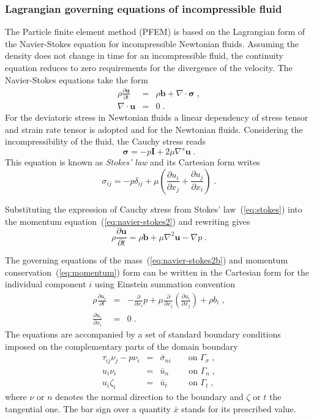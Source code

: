 \documentclass[a4paper]{report}
\newcommand{\mbf}[1]{\boldsymbol{#1}}
\newcommand{\pard}[2]{\frac{\partial{#1}}{\partial{#2}}}
\begin{document}
\subsubsection{Lagrangian governing equations of incompressible fluid}
The Particle finite element method (PFEM) is based on the Lagrangian form of the Navier-Stokes equation for incompressible Newtonian fluids. Assuming the density does not change in time for an incompressible fluid, the continuity equation reduces to zero requirements for the divergence of the velocity. The Navier-Stokes equations take the form
\begin{eqnarray}
\rho\pard{\mbf{u}}{t} &=& \rho\mbf{b} + \nabla\cdot\mbf{\sigma} \label{eq:navier-stokes2}\;,\\
\nabla\cdot\mbf{u} &=& 0\;. \label{eq:navier-stokes2b}
\end{eqnarray}
For the deviatoric stress in Newtonian fluids a linear dependency of stress tensor and strain rate tensor is adopted and for the Newtonian fluids. Considering the incompressibility of the fluid, the Cauchy stress reads
\begin{equation}\label{eq:stokes}
\mbf{\sigma}=-p\mbf{I} + 2\mu \nabla^s\mbf{u}\;.
\end{equation}
This equation is known as \emph{Stokes' law} and its Cartesian form writes
\begin{equation}
\sigma_{ij}=-p\delta_{ij}+\mu\left(\pard{u_i}{x_j}+\pard{u_j}{x_i}\right)\;.
\end{equation}
\par
Substituting the expression of Cauchy stress from Stokes' law~(\ref{eq:stokes}) into the momentum equation~(\ref{eq:navier-stokes2}) and rewriting gives
\begin{equation}
\rho\pard{\mbf{u}}{t} = \rho\mbf{b} + \mu\nabla^2\mbf{u} - \nabla p\;.\label{eq:momentum}
\end{equation}
\par
The governing equations of the mass~(\ref{eq:navier-stokes2b}) and momentum conservation~(\ref{eq:momentum}) form can be written in the Cartesian form for the individual component $i$ using Einstein summation convention
\begin{eqnarray}
\rho \pard{u_i}{t} &=& - \frac{\partial}{\partial x_i}p+\mu\frac{\partial}{\partial x_j}\left(\frac{\partial u_i}{\partial x_j}\right)+\rho b_i \;, \label{eq:mb}\\
\pard{u_i}{x_i} &=& 0\;.
\end{eqnarray}
The equations are accompanied by a set of standard boundary conditions imposed on the complementary parts of the domain boundary
\begin{eqnarray}
  \tau_{ij}\nu_j - p\nu_i &=& \bar \sigma_{ni} \qquad \mbox{on } \Gamma_{\sigma}\;, \\
  u_i\nu_i &=& \bar u_n \qquad\; \mbox{on } \Gamma_n\;, \\
  u_i\zeta_i &=& \bar u_t \qquad\;\, \mbox{on } \Gamma_t\;,
\end{eqnarray}
where $\nu$ or $n$ denotes the normal direction to the boundary and $\zeta$ or $t$ the tangential one. The bar sign over a quantity $\bar x$ stands for its prescribed value.
\end{document}
